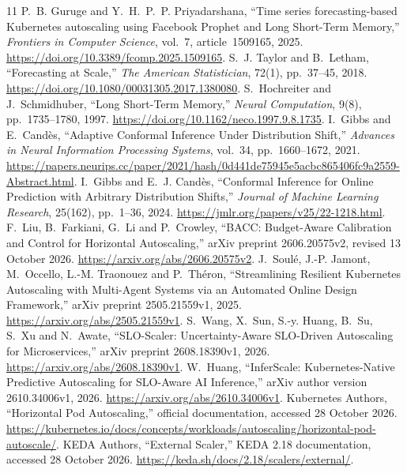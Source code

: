 \documentclass[11pt,a4paper]{article}
\begin{document}
\begin{thebibliography}{11}
 P.~B. Guruge and Y.~H.~P.~P. Priyadarshana, ``Time series forecasting-based Kubernetes autoscaling using Facebook Prophet and Long Short-Term Memory,'' \emph{Frontiers in Computer Science}, vol.~7, article~1509165, 2025. \url{https://doi.org/10.3389/fcomp.2025.1509165}.
 S.~J. Taylor and B.~Letham, ``Forecasting at Scale,'' \emph{The American Statistician}, 72(1), pp.~37--45, 2018. \url{https://doi.org/10.1080/00031305.2017.1380080}.
 S.~Hochreiter and J.~Schmidhuber, ``Long Short-Term Memory,'' \emph{Neural Computation}, 9(8), pp.~1735--1780, 1997. \url{https://doi.org/10.1162/neco.1997.9.8.1735}.
 I.~Gibbs and E.~Cand\`es, ``Adaptive Conformal Inference Under Distribution Shift,'' \emph{Advances in Neural Information Processing Systems}, vol.~34, pp.~1660--1672, 2021. \url{https://papers.neurips.cc/paper/2021/hash/0d441de75945e5acbc865406fc9a2559-Abstract.html}.
 I.~Gibbs and E.~J. Cand\`es, ``Conformal Inference for Online Prediction with Arbitrary Distribution Shifts,'' \emph{Journal of Machine Learning Research}, 25(162), pp.~1--36, 2024. \url{https://jmlr.org/papers/v25/22-1218.html}.
 F.~Liu, B.~Farkiani, G.~Li and P.~Crowley, ``BACC: Budget-Aware Calibration and Control for Horizontal Autoscaling,'' arXiv preprint 2606.20575v2, revised 13 October 2026. \url{https://arxiv.org/abs/2606.20575v2}.
 J.~Soul\'e, J.-P. Jamont, M.~Occello, L.-M. Traonouez and P.~Th\'eron, ``Streamlining Resilient Kubernetes Autoscaling with Multi-Agent Systems via an Automated Online Design Framework,'' arXiv preprint 2505.21559v1, 2025. \url{https://arxiv.org/abs/2505.21559v1}.
 S.~Wang, X.~Sun, S.-y. Huang, B.~Su, S.~Xu and N.~Awate, ``SLO-Scaler: Uncertainty-Aware SLO-Driven Autoscaling for Microservices,'' arXiv preprint 2608.18390v1, 2026. \url{https://arxiv.org/abs/2608.18390v1}.
 W.~Huang, ``InferScale: Kubernetes-Native Predictive Autoscaling for SLO-Aware AI Inference,'' arXiv author version 2610.34006v1, 2026. \url{https://arxiv.org/abs/2610.34006v1}.
 Kubernetes Authors, ``Horizontal Pod Autoscaling,'' official documentation, accessed 28 October 2026. \url{https://kubernetes.io/docs/concepts/workloads/autoscaling/horizontal-pod-autoscale/}.
 KEDA Authors, ``External Scaler,'' KEDA 2.18 documentation, accessed 28 October 2026. \url{https://keda.sh/docs/2.18/scalers/external/}.
\end{thebibliography}
\end{document}
